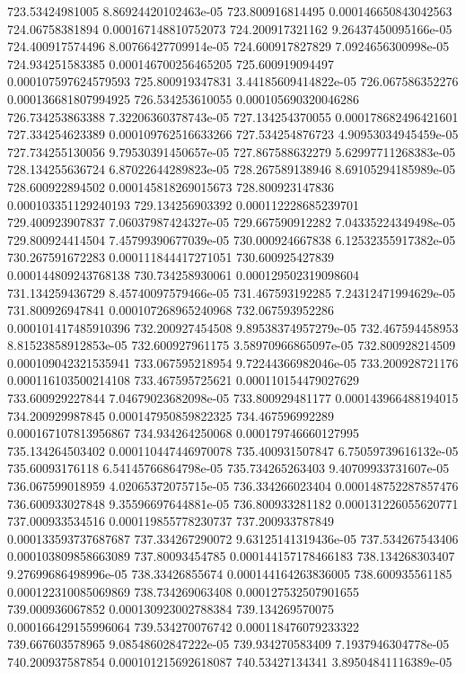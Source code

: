 {723.53424981005 8.86924420102463e-05
723.800916814495 0.000146650843042563
724.06758381894 0.000167148810752073
724.200917321162 9.26437450095166e-05
724.400917574496 8.00766427709914e-05
724.600917827829 7.0924656300998e-05
724.934251583385 0.000146700256465205
725.600919094497 0.000107597624579593
725.800919347831 3.44185609414822e-05
726.067586352276 0.000136681807994925
726.534253610055 0.000105690320046286
726.734253863388 7.32206360378743e-05
727.134254370055 0.000178682496421601
727.334254623389 0.000109762516633266
727.534254876723 4.90953034945459e-05
727.734255130056 9.79530391450657e-05
727.867588632279 5.62997711268383e-05
728.134255636724 6.87022644289823e-05
728.267589138946 8.69105294185989e-05
728.600922894502 0.000145818269015673
728.800923147836 0.000103351129240193
729.134256903392 0.000112228685239701
729.400923907837 7.06037987424327e-05
729.667590912282 7.04335224349498e-05
729.800924414504 7.45799390677039e-05
730.000924667838 6.12532355917382e-05
730.267591672283 0.000111844417271051
730.600925427839 0.000144809243768138
730.734258930061 0.000129502319098604
731.134259436729 8.45740097579466e-05
731.467593192285 7.24312471994629e-05
731.800926947841 0.000107268965240968
732.067593952286 0.000101417485910396
732.200927454508 9.89538374957279e-05
732.467594458953 8.81523858912853e-05
732.600927961175 3.58970966865097e-05
732.800928214509 0.000109042321535941
733.067595218954 9.72244366982046e-05
733.200928721176 0.000116103500214108
733.467595725621 0.000110154479027629
733.600929227844 7.04679023682098e-05
733.800929481177 0.000143966488194015
734.200929987845 0.000147950859822325
734.467596992289 0.000167107813956867
734.934264250068 0.000179746660127995
735.134264503402 0.000110447446970078
735.400931507847 6.75059739616132e-05
735.60093176118 6.54145766864798e-05
735.734265263403 9.40709933731607e-05
736.067599018959 4.02065372075715e-05
736.334266023404 0.000148752287857476
736.600933027848 9.35596697644881e-05
736.800933281182 0.000131226055620771
737.000933534516 0.000119855778230737
737.200933787849 0.000133593737687687
737.334267290072 9.63125141319436e-05
737.534267543406 0.000103809858663089
737.80093454785 0.000144157178466183
738.134268303407 9.27699686498996e-05
738.33426855674 0.000144164263836005
738.600935561185 0.000122310085069869
738.734269063408 0.000127532507901655
739.000936067852 0.000130923002788384
739.134269570075 0.000166429155996064
739.534270076742 0.000118476079233322
739.667603578965 9.08548602847222e-05
739.934270583409 7.1937946304778e-05
740.200937587854 0.000101215692618087
740.53427134341 3.89504841116389e-05
}

